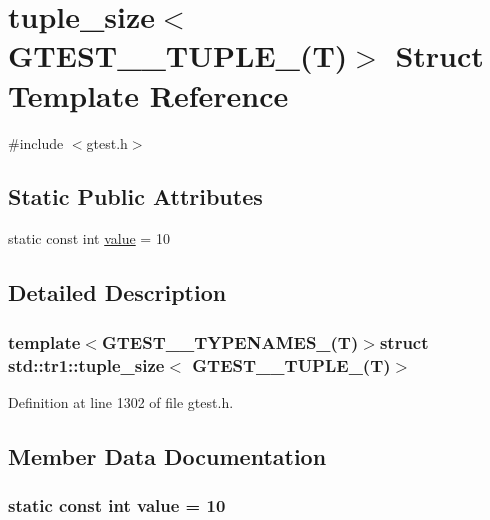 \hypertarget{structstd_1_1tr1_1_1tuple__size_3_01GTEST__10__TUPLE___07T_08_4}{\section{tuple\-\_\-size$<$ \-G\-T\-E\-S\-T\-\_\-\_\-\-T\-U\-P\-L\-E\-\_\-(\-T)$>$ \-Struct \-Template \-Reference}
\label{d0/d58/structstd_1_1tr1_1_1tuple__size_3_01GTEST__10__TUPLE___07T_08_4}
}


{\ttfamily \#include $<$gtest.\-h$>$}

\subsection*{\-Static \-Public \-Attributes}
\begin{DoxyCompactItemize}
\item 
static const int \hyperlink{structstd_1_1tr1_1_1tuple__size_3_01GTEST__10__TUPLE___07T_08_4_a3851384a21258869159d444f38396c70}{value} = 10
\end{DoxyCompactItemize}


\subsection{\-Detailed \-Description}
\subsubsection*{template$<$\-G\-T\-E\-S\-T\-\_\-\_\-\-T\-Y\-P\-E\-N\-A\-M\-E\-S\-\_\-(\-T)$>$struct std\-::tr1\-::tuple\-\_\-size$<$ G\-T\-E\-S\-T\-\_\-\_\-\-T\-U\-P\-L\-E\-\_\-(\-T)$>$}



\-Definition at line 1302 of file gtest.\-h.



\subsection{\-Member \-Data \-Documentation}
\hypertarget{structstd_1_1tr1_1_1tuple__size_3_01GTEST__10__TUPLE___07T_08_4_a3851384a21258869159d444f38396c70}{
\subsubsection[{value}]{\setlength{\rightskip}{0pt plus 5cm}static const int {\bf value} = 10}}\label{d0/d58/structstd_1_1tr1_1_1tuple__size_3_01GTEST__10__TUPLE___07T_08_4_a3851384a21258869159d444f38396c70}


